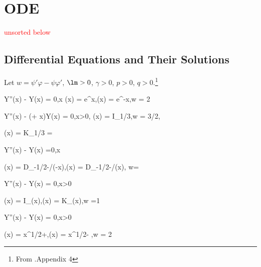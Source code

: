 
\chapter{ODE}

\qcutline

{\large \textcolor{red}{unsorted below}}


\section{Differential Equations and Their Solutions}

Let $w = \psi'\varphi - \psi \varphi'$, $\lm >0$, $\gamma>0$, $p>0$, $q>0$.\footnote{From \cite{Borodin_2002}.Appendix 4}

\ben
\item 
\be
{} Y''(x) - \lm Y(x) = 0,\quad x\in \R
\ee
\be
\psi(x) = e^{x\sqrt{2\lm}},\quad \varphi(x) = e^{-x\sqrt{2\lm}},\quad w = 2\sqrt{2\lm}
\ee

\item 
\be
{} Y''(x) - (\lm + \gamma x)Y(x) = 0,\quad x>0,
\ee
\be
\psi(x) = I_{1/3},\quad\quad w = 3\gamma/2,
\ee

\be
\varphi(x) = K_{1/3} = \pi {}\ai{}
\ee


\item 
\be
{} Y''(x) - Y(x) =0,\quad x\in\R
\ee

\be
\psi(x) = D_{-1/2-\lm/\gamma}(-x\sqrt{2\gamma}),\quad\quad \varphi(x) = D_{-1/2-\lm/\gamma}(x\sqrt{2\gamma}), \quad\quad w=
\ee


\item 
\be
{} Y''(x) - Y(x) = 0,\quad x>0
\ee

\be
\psi(x) =  I_\gamma(x\sqrt{2\lm}),\quad\quad \varphi(x) = K_\gamma(x\sqrt{2\lm}),\quad \quad w =1
\ee

\item 
\be
{} Y''(x) - Y(x) = 0,\quad x>0
\ee

\be
\psi(x) = x^{1/2+\gamma},\quad\quad \varphi(x) = x^{1/2-\gamma} ,\quad \quad w = 2\gamma
\ee

\item 

